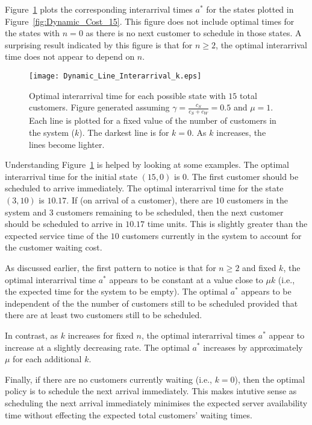 Figure~\ref{fig:Dynamic_Time_15} plots the corresponding interarrival times $a^{*}$ for the states plotted in Figure~\ref{fig:Dynamic_Cost_15}. This figure does not include optimal times for the states with $n = 0$ as there is no next customer to schedule in those states. A surprising result indicated by this figure is that for $n \geq 2$, the optimal interarrival time does not appear to depend on $n$.
\begin{figure}[htb]
	\centering
	\texttt{[image: Dynamic\_Line\_Interarrival\_k.eps]}
	\caption{Optimal interarrival time for each possible state with $15$ total customers. Figure generated assuming $\gamma = \frac{c_{S}}{c_{S} + c_{W}} = 0.5$ and $\mu = 1$. Each line is plotted for a fixed value of the number of customers in the system ($k$). The darkest line is for $k = 0$. As $k$ increases, the lines become lighter.}
	\label{fig:Dynamic_Time_15}
\end{figure}

Understanding Figure~\ref{fig:Dynamic_Time_15} is helped by looking at some examples. The optimal interarrival time for the initial state $(15, 0)$ is $0$. The first customer should be scheduled to arrive immediately. The optimal interarrival time for the state $(3, 10)$ is $10.17$. If (on arrival of a customer), there are $10$ customers in the system and $3$ customers remaining to be scheduled, then the next customer should be scheduled to arrive in $10.17$ time units. This is slightly greater than the expected service time of the $10$ customers currently in the system to account for the customer waiting cost.

As discussed earlier, the first pattern to notice is that for $n \geq 2$ and fixed $k$, the optimal interarrival time $a^{*}$ appears to be constant at a value close to $\mu k$ (i.e., the expected time for the system to be empty). The optimal $a^{*}$ appears to be independent of the the number of customers still to be scheduled provided that there are at least two customers still to be scheduled.

In contrast, as $k$ increases for fixed $n$, the optimal interarrival times $a^{*}$ appear to increase at a slightly decreasing rate. The optimal $a^{*}$ increases by approximately $\mu$ for each additional $k$.

Finally, if there are no customers currently waiting (i.e., $k = 0$), then the optimal policy is to schedule the next arrival immediately. This makes intutive sense as scheduling the next arrival immediately minimises the expected server availability time without effecting the expected total customers' waiting times.

































